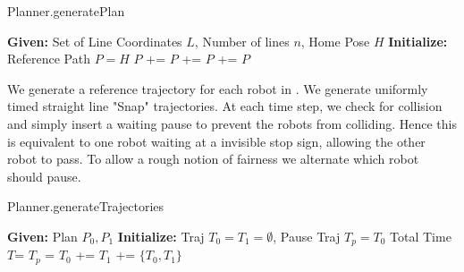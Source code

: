 \begin{algorithm}[ht!]
\caption{Planner.generatePlan}
\label{algo:generatePlan}
\begin{algorithmic}[1]  
\State \textbf{Given:} Set of Line Coordinates $L$, Number of lines $n$, Home Pose $H$
\State \textbf{Initialize:} Reference Path $P = H$
\State $P$ += 
\State $P$ += 
\EndProcedure
\State $P$ += 
\State \Return $P$
\end{algorithmic}
\end{algorithm}

We generate a reference trajectory for each robot in . We generate uniformly timed straight line "Snap" trajectories. At each time step, we check for collision and simply insert a waiting pause to prevent the robots from colliding. Hence this is equivalent to one robot waiting at a invisible stop sign, allowing the other robot to pass. To allow a rough notion of fairness we alternate which robot should pause.

\begin{algorithm}[ht!]
\caption{Planner.generateTrajectories}
\label{algo:generateTrajs} 
\begin{algorithmic}[1]  
\State \textbf{Given:} Plan $P_{0}, P_{1}$ 
\State \textbf{Initialize:} Traj $T_{0} = T_{1} = \emptyset$, Pause Traj $T_{p} = T_{0}$
\State Total Time $T$= 
\State {}
\State $T_{p}$ = 
\EndIf 
\State $T_{0}$ += 
\State $T_{1}$ += 
\EndProcedure
\State \Return $\{T_{0}, T_{1}\}$
\end{algorithmic}
\end{algorithm}
